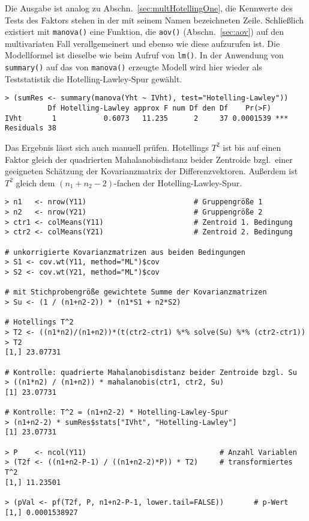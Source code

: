 Die Ausgabe ist analog zu Abschn.\ \ref{sec:multHotellingOne}, die Kennwerte des Tests des Faktors stehen in der mit seinem Namen bezeichneten Zeile. Schließlich existiert mit \lstinline!manova()! eine Funktion, die \lstinline!aov()! (Abschn.\ \ref{sec:aov}) auf den multivariaten Fall verallgemeinert und ebenso wie diese aufzurufen ist. Die Modellformel ist dieselbe wie beim Aufruf von \lstinline!lm()!. In der Anwendung von \lstinline!summary()! auf das von \lstinline!manova()! erzeugte Modell wird hier wieder als Teststatistik die Hotelling-Lawley-Spur gewählt.
\begin{lstlisting}
> (sumRes <- summary(manova(Yht ~ IVht), test="Hotelling-Lawley"))
          Df Hotelling-Lawley approx F num Df den Df    Pr(>F)
IVht       1           0.6073   11.235      2     37 0.0001539 ***
Residuals 38
\end{lstlisting}

Das Ergebnis lässt sich auch manuell prüfen. Hotellings $T^{2}$ ist bis auf einen Faktor gleich der quadrierten Mahalanobisdistanz beider Zentroide bzgl.\ einer geeigneten Schätzung der Kovarianzmatrix der Differenzvektoren. Außerdem ist $T^{2}$ gleich dem $(n_{1}+n_{2}-2)$-fachen der Hotelling-Lawley-Spur.
\begin{lstlisting}
> n1   <- nrow(Y11)                         # Gruppengröße 1
> n2   <- nrow(Y21)                         # Gruppengröße 2
> ctr1 <- colMeans(Y11)                     # Zentroid 1. Bedingung
> ctr2 <- colMeans(Y21)                     # Zentroid 2. Bedingung

# unkorrigierte Kovarianzmatrizen aus beiden Bedingungen
> S1 <- cov.wt(Y11, method="ML")$cov
> S2 <- cov.wt(Y21, method="ML")$cov

# mit Stichprobengröße gewichtete Summe der Kovarianzmatrizen
> Su <- (1 / (n1+n2-2)) * (n1*S1 + n2*S2)

# Hotellings T^2
> T2 <- ((n1*n2)/(n1+n2))*(t(ctr2-ctr1) %*% solve(Su) %*% (ctr2-ctr1))
> T2
[1,] 23.07731

# Kontrolle: quadrierte Mahalanobisdistanz beider Zentroide bzgl. Su
> ((n1*n2) / (n1+n2)) * mahalanobis(ctr1, ctr2, Su)
[1] 23.07731

# Kontrolle: T^2 = (n1+n2-2) * Hotelling-Lawley-Spur
> (n1+n2-2) * sumRes$stats["IVht", "Hotelling-Lawley"]
[1] 23.07731

> P    <- ncol(Y11)                               # Anzahl Variablen
> (T2f <- ((n1+n2-P-1) / ((n1+n2-2)*P)) * T2)     # transformiertes T^2
[1,] 11.23501

> (pVal <- pf(T2f, P, n1+n2-P-1, lower.tail=FALSE))       # p-Wert
[1,] 0.0001538927
\end{lstlisting}


